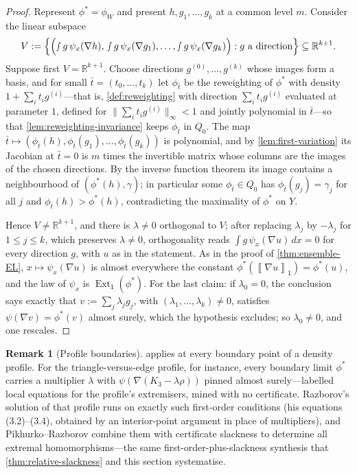 \documentclass[11pt]{article}
\theoremstyle{definition}
\newtheorem{remark}[remark]{Remark}
\newcommand{\R}{\mathbb{R}}
\newcommand{\Ext}{\operatorname{Ext}}
\newcommand{\avg}[2]{\left\llbracket #1 \right\rrbracket_{#2}}
\newcommand{\vtype}{\mathsf{1}}
\begin{document}
\begin{proof}
Represent $\phi^\ast=\phi_W$ and present $h,g_1,\dots,g_k$ at a common level $m$.
Consider the linear subspace
\[
  V:=\Bigl\{\Bigl(\smallint g\,\psi_x(\nabla h),\,
  \smallint g\,\psi_x(\nabla g_1),\dots,
  \smallint g\,\psi_x(\nabla g_k)\Bigr):g\ \text{a direction}\Bigr\}
  \subseteq\R^{k+1}.
\]
Suppose first $V=\R^{k+1}$.  Choose directions $g^{(0)},\dots,g^{(k)}$ whose images
form a basis, and for small $\bar t=(t_0,\dots,t_k)$ let $\phi_{\bar t}$ be the
reweighting of $\phi^\ast$ with density $1+\sum_it_ig^{(i)}$---that is,
\cref{def:reweighting} with direction $\sum_it_ig^{(i)}$ evaluated at parameter $1$,
defined for $\|\sum_it_ig^{(i)}\|_\infty<1$ and jointly polynomial in $\bar t$---so
that \cref{lem:reweighting-invariance} keeps $\phi_{\bar t}$ in $Q_0$.  The map
$\bar t\mapsto(\phi_{\bar t}(h),\phi_{\bar t}(g_1),\dots,\phi_{\bar t}(g_k))$ is
polynomial, and by \cref{lem:first-variation} its Jacobian at $\bar t=0$ is $m$ times
the invertible matrix whose columns are the images of the chosen directions.  By the inverse function
theorem its image contains a neighbourhood of
$(\phi^\ast(h),\gamma)$; in particular some $\phi_{\bar t}\in Q_0$ has
$\phi_{\bar t}(g_j)=\gamma_j$ for all $j$ and $\phi_{\bar t}(h)>\phi^\ast(h)$,
contradicting the maximality of $\phi^\ast$ on $Y$.

Hence $V\neq\R^{k+1}$, and there is $\lambda\neq0$ orthogonal to $V$; after replacing
$\lambda_j$ by $-\lambda_j$ for $1\le j\le k$, which preserves $\lambda\neq0$,
orthogonality reads $\int g\,\psi_x(\nabla u)\,dx=0$ for every direction $g$, with $u$
as in the statement.
As in the proof of \cref{thm:ensemble-EL}, $x\mapsto\psi_x(\nabla u)$ is almost
everywhere the constant $\phi^\ast(\avg{\nabla u}{\vtype})=\phi^\ast(u)$, and the law
of $\psi_x$ is $\Ext_\vtype(\phi^\ast)$.  For the last claim: if $\lambda_0=0$, the
conclusion says exactly that $v:=\sum_j\lambda_jg_j$, with
$(\lambda_1,\dots,\lambda_k)\neq0$, satisfies
$\psi(\nabla v)=\phi^\ast(v)$ almost surely, which the hypothesis excludes; so
$\lambda_0\neq0$, and one rescales.
\end{proof}

\begin{remark}[Profile boundaries]
 applies at every boundary point of a density profile.  For the
triangle-versus-edge profile, for instance, every boundary limit
$\phi^\ast$ carries a multiplier $\lambda$ with
$\psi(\nabla(K_3-\lambda\rho))$ pinned almost surely---labelled local equations for
the profile's extremisers, mined with no certificate.  Razborov's solution of that
profile \cite{Razborov2008} runs on exactly such first-order conditions (his equations
(3.2)--(3.4), obtained by an interior-point argument in place of multipliers), and
Pikhurko--Razborov \cite{PikhurkoRazborov2017} combine them with certificate
slackness to determine all extremal homomorphisms---the same first-order-plus-slackness
synthesis that \cref{thm:relative-slackness} and this section systematise.
\end{remark}
\end{document}
